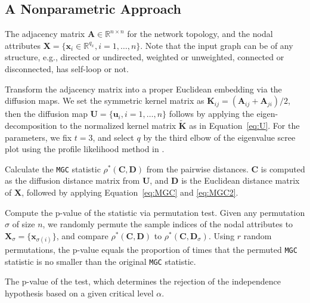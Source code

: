 \documentclass[12pt]{article}
\theoremstyle{definition}
\begin{document}
	\subsection{A Nonparametric Approach}
	\label{ssec:method}
	\begin{description}[align=left]
		\item [Input: ]  The adjacency matrix $\mathbf{A} \in \mathbb{R}^{n \times n}$ for the network topology, and the nodal attributes $\mathbf{X}=\{\mathbf{x}_i \in \mathbb{R}^{q_{x}}, i=1,\ldots,n\}$. Note that the input graph can be of any structure, e.g., directed or undirected, weighted or unweighted, connected or disconnected, has self-loop or not. 
		
		\item [Step 1:] Transform the adjacency matrix into a proper Euclidean embedding via the diffusion maps. We set the symmetric kernel matrix as $\mathbf{K}_{ij}=(\mathbf{A}_{ij}+\mathbf{A}_{ji})/2$, then the diffusion map $\mathbf{U}=\{\mathbf{u}_{i},i=1,\ldots,n\}$ follows by applying the eigen-decomposition to the normalized kernel matrix $\mathbf{\widetilde{K}}$ as in Equation~\ref{eq:U}. For the parameters, we fix $t=3$, and select $q$ by the third elbow of the eigenvalue scree plot using the profile likelihood method in \cite{ZhuGhodsi2006}.
		
		\item [Step 2:] Calculate the \texttt{MGC} statistic $\rho^{*}(\mathbf{C}, \mathbf{D})$ from the pairwise distances. $\mathbf{C}$ is computed as the diffusion distance matrix from $\mathbf{U}$, and $\mathbf{D}$ is the Euclidean distance matrix of $\mathbf{X}$, followed by applying Equation~\ref{eq:MGC} and \ref{eq:MGC2}.
		
		\item [Step 3:] Compute the p-value of the statistic via permutation test. Given any permutation $\sigma$ of size $n$, we randomly permute the sample indices of the nodal attributes to $\mathbf{X}_{\sigma}=\{\mathbf{x}_{\sigma(i)}\}$, and compare $\rho^{*}(\mathbf{C}, \mathbf{D})$ to $\rho^{*}(\mathbf{C}, \mathbf{D}_{\sigma})$. Using $r$ random permutations, the p-value equals the proportion of times that the permuted \texttt{MGC} statistic is no smaller than the original \texttt{MGC} statistic. 
		
		\item [Output:] The p-value of the test, which determines the rejection of the independence hypothesis based on a given critical level $\alpha$.
	\end{description}
	
\end{document}
